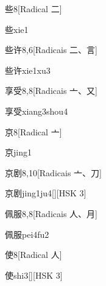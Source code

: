 \begin{entry}{些}{8}[Radical ⼆]
  \begin{phonetics}{些}{xie1}
  \end{phonetics}
\end{entry}

\begin{entry}{些许}{8,6}[Radicais ⼆、⾔]
  \begin{phonetics}{些许}{xie1xu3}
  \end{phonetics}
\end{entry}

\begin{entry}{享受}{8,8}[Radicais ⼇、⼜]
  \begin{phonetics}{享受}{xiang3shou4}
  \end{phonetics}
\end{entry}

\begin{entry}{京}{8}[Radical ⼇]
  \begin{phonetics}{京}{jing1}
  \end{phonetics}
\end{entry}

\begin{entry}{京剧}{8,10}[Radicais ⼇、⼑]
  \begin{phonetics}{京剧}{jing1ju4}[][HSK 3]
  \end{phonetics}
\end{entry}

\begin{entry}{佩服}{8,8}[Radicais ⼈、⽉]
  \begin{phonetics}{佩服}{pei4fu2}
  \end{phonetics}
\end{entry}

\begin{entry}{使}{8}[Radical ⼈]
  \begin{phonetics}{使}{shi3}[][HSK 3]
  \end{phonetics}
\end{entry}

